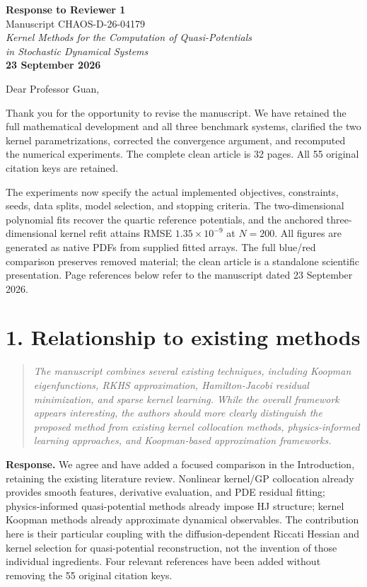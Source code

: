 \documentclass[11pt]{article}
\newcommand{\comment}[1]{\begin{quote}\small\itshape #1\end{quote}}
\begin{document}
\begin{center}
{\Large\bfseries Response to Reviewer 1}\\[7pt]
Manuscript CHAOS-D-26-04179\\[5pt]
\textit{Kernel Methods for the Computation of Quasi-Potentials\\in Stochastic Dynamical Systems}\\[5pt]
\textbf{23 September 2026}
\end{center}

Dear Professor Guan,

Thank you for the opportunity to revise the manuscript. We have retained the full mathematical development and all three benchmark systems, clarified the two kernel parametrizations, corrected the convergence argument, and recomputed the numerical experiments. The complete clean article is 32 pages. All 55 original citation keys are retained.

The experiments now specify the actual implemented objectives, constraints, seeds, data splits, model selection, and stopping criteria. The two-dimensional polynomial fits recover the quartic reference potentials, and the anchored three-dimensional kernel refit attains RMSE $1.35\times10^{-9}$ at $N=200$. All figures are generated as native PDFs from supplied fitted arrays. The full blue/red comparison preserves removed material; the clean article is a standalone scientific presentation. Page references below refer to the manuscript dated 23 September 2026.

\section*{1. Relationship to existing methods}
\comment{The manuscript combines several existing techniques, including Koopman eigenfunctions, RKHS approximation, Hamilton-Jacobi residual minimization, and sparse kernel learning. While the overall framework appears interesting, the authors should more clearly distinguish the proposed method from existing kernel collocation methods, physics-informed learning approaches, and Koopman-based approximation frameworks.}

\textbf{Response.} We agree and have added a focused comparison in the Introduction, retaining the existing literature review. Nonlinear kernel/GP collocation already provides smooth features, derivative evaluation, and PDE residual fitting; physics-informed quasi-potential methods already impose HJ structure; kernel Koopman methods already approximate dynamical observables. The contribution here is their particular coupling with the diffusion-dependent Riccati Hessian and kernel selection for quasi-potential reconstruction, not the invention of those individual ingredients. Four relevant references have been added without removing the 55 original citation keys.
\end{document}
